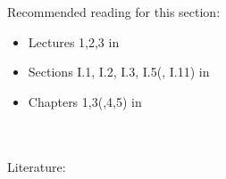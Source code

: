 \begin{frame}
	Recommended reading for this section:
	\begin{itemize}
		\item Lectures 1,2,3 in \cite{TreBau}
		\item Sections I.1, I.2, I.3, I.5(, I.11) in \cite{StrangData}
		\item Chapters 1,3(,4,5) in \cite{StrangLA_intro}
	\end{itemize}
	
	
	~\\~\\
	Literature:\\
	
\end{frame}


